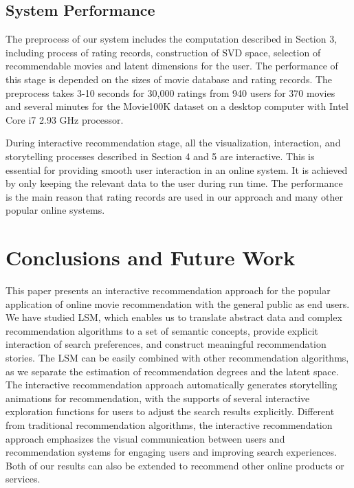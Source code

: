 \documentclass{vgtc}                          %
\begin{document}
\subsection{System Performance}

The preprocess of our system includes the computation described in Section 3, including process of rating records, construction of SVD space, selection of recommendable movies and latent dimensions for the user. 
The performance of this stage is depended on the sizes of movie database and rating records.
The preprocess takes 3-10 seconds for 30,000 ratings from 940 users for 370 movies and several minutes for the Movie100K dataset on a desktop computer with Intel Core i7 2.93 GHz processor.

During interactive recommendation stage, all the visualization, interaction, and storytelling processes described in Section 4 and 5 are interactive. 
This is essential for providing smooth user interaction in an online system.
It is achieved by only keeping the relevant data to the user during run time.
The performance is the main reason that rating records are used in our approach and many other popular online systems.

%
%

%

\section{Conclusions and Future Work}

This paper presents an interactive recommendation approach for the popular application of online movie recommendation with the general public as end users.
We have studied LSM, which enables us to translate abstract data and complex recommendation algorithms to a set of semantic concepts, provide explicit interaction of search preferences, and construct meaningful recommendation stories.
The LSM can be easily combined with other recommendation algorithms, as we separate the estimation of recommendation degrees and the latent space.
The interactive recommendation approach automatically generates storytelling animations for recommendation, with the supports of several interactive exploration functions for users to adjust the search results explicitly. 
Different from traditional recommendation algorithms, the interactive recommendation approach emphasizes the visual communication between users and recommendation systems for engaging users and improving search experiences.
Both of our results can also be extended to recommend other online products or services.
\end{document}
